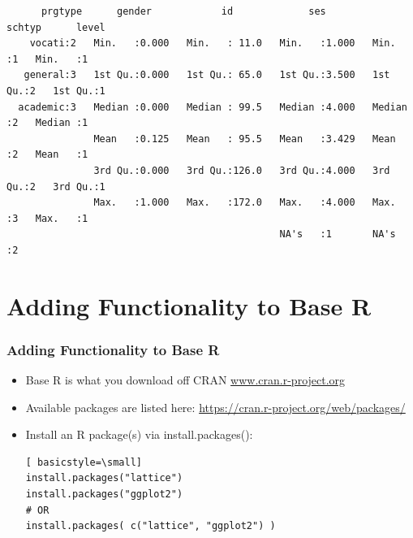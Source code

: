 \begin{frame}
\begin{itemize}
{ \tiny
	\begin{verbatim}
      prgtype      gender            id             ses            schtyp      level  
    vocati:2   Min.   :0.000   Min.   : 11.0   Min.   :1.000   Min.   :1   Min.   :1  
   general:3   1st Qu.:0.000   1st Qu.: 65.0   1st Qu.:3.500   1st Qu.:2   1st Qu.:1  
  academic:3   Median :0.000   Median : 99.5   Median :4.000   Median :2   Median :1  
               Mean   :0.125   Mean   : 95.5   Mean   :3.429   Mean   :2   Mean   :1  
               3rd Qu.:0.000   3rd Qu.:126.0   3rd Qu.:4.000   3rd Qu.:2   3rd Qu.:1  
               Max.   :1.000   Max.   :172.0   Max.   :4.000   Max.   :3   Max.   :1  
                                               NA's   :1       NA's   :2              
	\end{verbatim}	
}
	\end{itemize}
\end{frame}


\section{Adding Functionality to Base R}

\begin{frame}[fragile]
	\frametitle{Adding Functionality to Base R}

	\begin{itemize}
		\item Base R is what you download off CRAN \url{www.cran.r-project.org} 
		\item Available packages are listed here: \url{https://cran.r-project.org/web/packages/}
		\item Install an R package(s) via \ttfamily install.packages(): \normalfont 
   	\begin{lstlisting}[ basicstyle=\small]
install.packages("lattice")
install.packages("ggplot2")
# OR
install.packages( c("lattice", "ggplot2") )

	\end{lstlisting}
	\end{itemize} 	
\end{frame}



